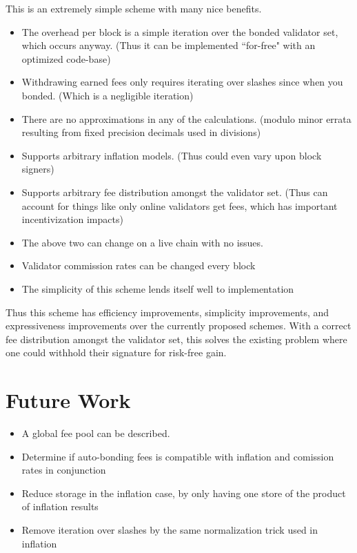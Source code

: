 \documentclass[]{article}
\begin{document}
This is an extremely simple scheme with many nice benefits. 
\begin{itemize}
	\item The overhead per block is a simple iteration over the bonded validator set, which occurs anyway. (Thus it can be implemented ``for-free" with an optimized code-base)
	\item Withdrawing earned fees only requires iterating over slashes since when you bonded. (Which is a negligible iteration)
	\item There are no approximations in any of the calculations. (modulo minor errata resulting from fixed precision decimals used in divisions)
	\item Supports arbitrary inflation models. (Thus could even vary upon block signers)
	\item Supports arbitrary fee distribution amongst the validator set. (Thus can account for things like only online validators get fees, which has important incentivization impacts)
	\item The above two can change on a live chain with no issues.
	\item Validator commission rates can be changed every block
	\item The simplicity of this scheme lends itself well to implementation
\end{itemize}

Thus this scheme has efficiency improvements, simplicity improvements, and expressiveness improvements over the currently proposed schemes. With a correct fee distribution amongst the validator set, this solves the existing problem where one could withhold their signature for risk-free gain.

\section{Future Work}

\begin{itemize}
	\item A global fee pool can be described.
	\item Determine if auto-bonding fees is compatible with inflation and comission rates in conjunction
	\item Reduce storage in the inflation case, by only having one store of the product of inflation results
	\item Remove iteration over slashes by the same normalization trick used in inflation
\end{itemize}
\end{document}
